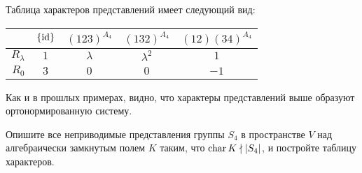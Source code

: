 \begin{solution}
	Таблица характеров представлений имеет следующий вид:
	\begin{center}
		\begin{tabular}{r|c|c|c|c}
			& $\{\mathrm{id}\}$ & $(123)^{A_4}$ & $(132)^{A_4}$ & $(12)(34)^{A_4}$ \\ \hline
			$R_\lambda$ &    $1$    &   $\lambda$   &  $\lambda^2$  &      $1$      \\ \hline
			$R_0$ &    $3$    &      $0$      &      $0$      &       $-1$
		\end{tabular}
	\end{center}
	
	Как и в прошлых примерах, видно, что характеры представлений выше образуют ортонормированную систему.
\end{solution}

\begin{problem}
	Опишите все неприводимые представления группы $S_4$ в пространстве $V$ над алгебраически замкнутым полем $K$ таким, что $\operatorname{char}{K} \nmid |S_4|$, и постройте таблицу характеров.
\end{problem}

